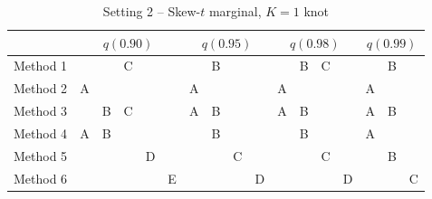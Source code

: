 \documentclass[11pt]{article}
\begin{document}

\begin{table}[htbp]
  \centering
  \caption{Setting 2 -- Skew-$t$ marginal, $K = 1$ knot}
  \label{tbl:st1sim}
  \begin{tabular}{|l|ccccc|cccc|cccc|ccc|}
    \cline{2-17}
    \multicolumn{1}{c}{} & \multicolumn{5}{|c}{$q(0.90)$} & \multicolumn{4}{|c}{$q(0.95)$} & \multicolumn{4}{|c}{$q(0.98)$} & \multicolumn{3}{|c|}{$q(0.99)$} \\
    \hline
    Method 1 &   &   & C &   &   &   & B &   &   &   & B & C &   &   & B &   \\
    \hline
    Method 2 & A &   &   &   &   & A &   &   &   & A &   &   &   & A &   &   \\
    \hline
    Method 3 &   & B & C &   &   & A & B &   &   & A & B &   &   & A & B &   \\
    \hline
    Method 4 & A & B &   &   &   &   & B &   &   &   & B &   &   & A &   &   \\
    \hline
    Method 5 &   &   &   & D &   &   &   & C &   &   &   & C &   &   & B &   \\
    \hline
    Method 6 &   &   &   &   & E &   &   &   & D &   &   &   & D &   &   & C \\
    \hline
  \end{tabular}
\end{table}
\end{document}

